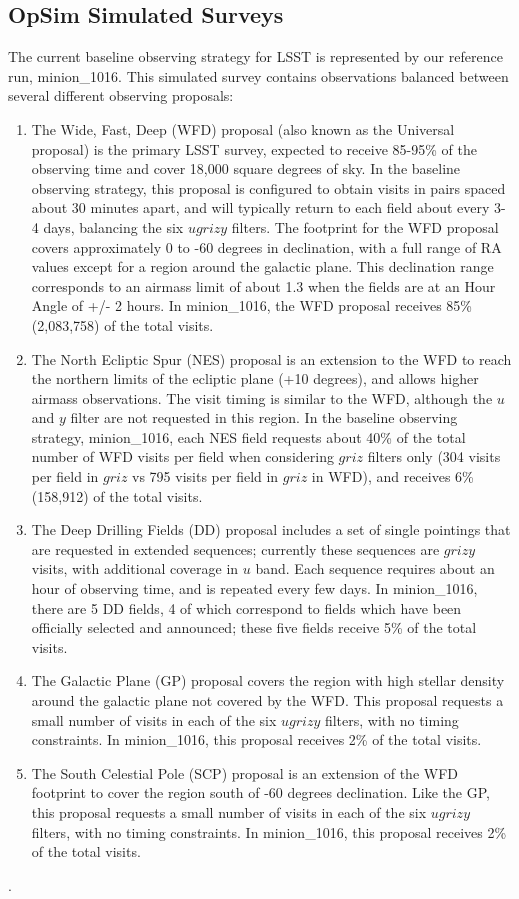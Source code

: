 \subsection{OpSim Simulated Surveys}

The current baseline observing strategy for LSST is represented by our reference run, minion\_1016. This simulated survey contains observations balanced between several different observing proposals:
\begin{enumerate}
\item The Wide, Fast, Deep (WFD) proposal (also known as the Universal proposal) is the primary LSST survey, expected to receive 85-95\% of the observing time and cover 18,000 square degrees of sky. In the baseline observing strategy, this proposal is configured to obtain visits in pairs spaced about 30 minutes apart, and will typically return to each field about every 3-4 days, balancing the six $ugrizy$ filters. The footprint for the WFD proposal covers approximately 0 to -60 degrees in declination, with a full range of RA values except for a region around the galactic plane. This declination range corresponds to an airmass limit of about 1.3 when the fields are at an Hour Angle of +/- 2 hours. In minion\_1016, the WFD proposal receives 85\% (2,083,758) of the total visits.
\item The North Ecliptic Spur (NES) proposal is an extension to the WFD to reach the northern limits of the ecliptic plane (+10 degrees), and allows higher airmass observations. The visit timing is similar to the WFD, although the $u$ and $y$ filter are not requested in this region. In the baseline observing strategy, minion\_1016, each NES field requests about 40\% of the total number of WFD visits per field when considering $griz$ filters only (304 visits per field in $griz$ vs 795 visits per field in $griz$ in WFD), and receives 6\% (158,912) of the total visits. 
\item The Deep Drilling Fields (DD) proposal includes a set of single pointings that are requested in extended sequences; currently these sequences are $grizy$ visits, with additional coverage in $u$ band. Each sequence requires about an hour of observing time, and is repeated every few days. In minion\_1016, there are 5 DD fields, 4 of which correspond to fields which have been officially selected and announced; these five fields receive 5\% of the total visits. 
\item The Galactic Plane (GP) proposal covers the region with high stellar density around the galactic plane not covered by the WFD. This proposal requests a small number of visits in each of the six $ugrizy$ filters, with no timing constraints. In minion\_1016, this proposal receives 2\% of the total visits. 
\item The South Celestial Pole (SCP) proposal is an extension of the WFD footprint to cover the region south of -60 degrees declination. Like the GP, this proposal requests a small number of visits in each of the six $ugrizy$ filters, with no timing constraints. In minion\_1016, this proposal receives 2\% of the total visits.
\end{enumerate}. 
